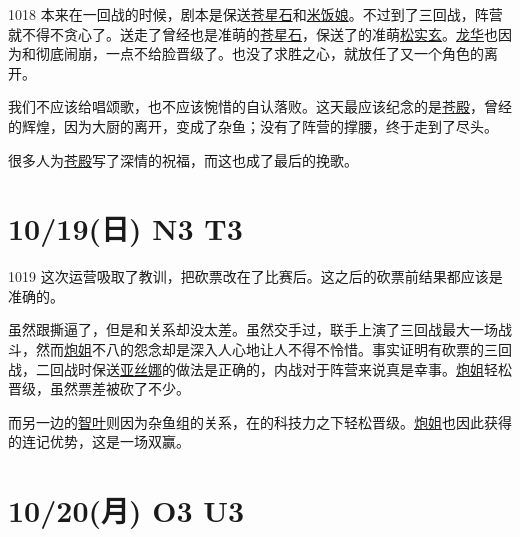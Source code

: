 1018 本来在一回战的时候，剧本是保送\uline{苍星石}和\uline{米饭娘}。不过到了三回战，阵营就不得不贪心了。送走了曾经也是准萌的\uline{苍星石}，保送了的准萌\uline{松实玄}。\uline{龙华}也因为和彻底闹崩，一点不给脸晋级了。也没了求胜之心，就放任了又一个角色的离开。

我们不应该给唱颂歌，也不应该惋惜的自认落败。这天最应该纪念的是\uline{苍殿}，曾经的辉煌，因为大厨的离开，变成了杂鱼；没有了阵营的撑腰，终于走到了尽头。

很多人为\uline{苍殿}写了深情的祝福，而这也成了最后的挽歌。
\newpage
\section{10/19(日) N3 T3}


1019 这次运营吸取了教训，把砍票改在了比赛后。这之后的{\kai 砍票前}结果都应该是准确的。

虽然跟撕逼了，但是和关系却没太差。虽然交手过，联手上演了三回战最大一场战斗，然而\uline{炮姐}不八的怨念却是深入人心地让人不得不怜惜。事实证明有砍票的三回战，二回战时保送\uline{亚丝娜}的做法是正确的，内战对于阵营来说真是幸事。\uline{炮姐}轻松晋级，虽然票差被砍了不少。

而另一边的\uline{智叶}则因为杂鱼组的关系，在的科技力之下轻松晋级。\uline{炮姐}也因此获得的连记优势，这是一场双赢。

\section{10/20(月) O3 U3}

